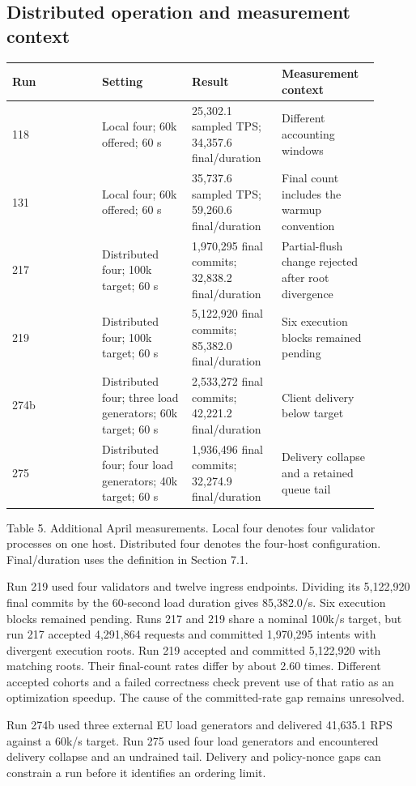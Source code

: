 \documentclass[11pt]{article}
\begin{document}
\subsection{Distributed operation and measurement context}
{\small\begin{longtable}{@{}p{0.225\linewidth}p{0.225\linewidth}p{0.225\linewidth}p{0.225\linewidth}@{}}
\toprule
Run & Setting & Result & Measurement context \\
\midrule
\endhead
118 & Local four; 60k offered; 60 s & 25,302.1 sampled TPS; 34,357.6 final/duration & Different accounting windows \\
131 & Local four; 60k offered; 60 s & 35,737.6 sampled TPS; 59,260.6 final/duration & Final count includes the warmup convention \\
217 & Distributed four; 100k target; 60 s & 1,970,295 final commits; 32,838.2 final/duration & Partial-flush change rejected after root divergence \\
219 & Distributed four; 100k target; 60 s & 5,122,920 final commits; 85,382.0 final/duration & Six execution blocks remained pending \\
274b & Distributed four; three load generators; 60k target; 60 s & 2,533,272 final commits; 42,221.2 final/duration & Client delivery below target \\
275 & Distributed four; four load generators; 40k target; 60 s & 1,936,496 final commits; 32,274.9 final/duration & Delivery collapse and a retained queue tail \\
\bottomrule
\end{longtable}}
Table 5. Additional April measurements. Local four denotes four validator processes on one host. Distributed four denotes the four-host configuration. Final/duration uses the definition in Section 7.1. \cite{R13}

Run 219 used four validators and twelve ingress endpoints. Dividing its 5,122,920 final commits by the 60-second load duration gives 85,382.0/s. Six execution blocks remained pending. Runs 217 and 219 share a nominal 100k/s target, but run 217 accepted 4,291,864 requests and committed 1,970,295 intents with divergent execution roots. Run 219 accepted and committed 5,122,920 with matching roots. Their final-count rates differ by about 2.60 times. Different accepted cohorts and a failed correctness check prevent use of that ratio as an optimization speedup. The cause of the committed-rate gap remains unresolved. \cite{R13}

Run 274b used three external EU load generators and delivered 41,635.1 RPS against a 60k/s target. Run 275 used four load generators and encountered delivery collapse and an undrained tail. Delivery and policy-nonce gaps can constrain a run before it identifies an ordering limit. \cite{R13}
\end{document}
